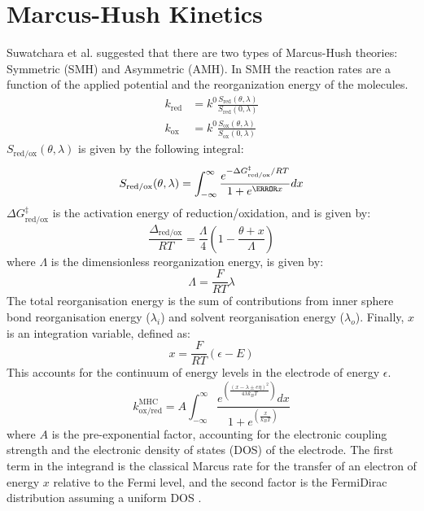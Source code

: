 \documentclass[12pt]{book}
\begin{document}
\section{Marcus-Hush Kinetics}
Suwatchara et al. suggested that there are two types of Marcus-Hush theories: Symmetric (SMH) and Asymmetric (AMH). In SMH the reaction rates are a function of the applied potential and the reorganization energy of the molecules\cite{Suwatchara2012}.
\begin{align}
k_\textrm{red} &= k^0 \frac{S_\textrm{red}(\theta,\lambda)}{S_\textrm{red}(0,\lambda)}\\
k_\textrm{ox} &= k^0 \frac{S_\textrm{ox}(\theta,\lambda)}{S_\textrm{ox}(0,\lambda)}
\end{align}
$S_\textrm{red/ox}(\theta,\lambda)$ is given by the following integral:
\begin{equation}
S_\textrm{red/ox}(\theta,\lambda) = \int_{-\infty}^{\infty} \frac{e^{-\Delta G_\textrm{red/ox}^\ddagger / RT}}{1+ e^{\ps x}}dx
\end{equation}
$\Delta G_\textrm{red/ox}^\ddagger$ is the activation energy of reduction/oxidation, and is given by:
\begin{equation}
\frac{\Delta_\textrm{red/ox}}{RT} = \frac{\Lambda}{4}\left(1 - \frac{\theta + x}{\Lambda}\right)
\end{equation}
where $\Lambda$ is the dimensionless reorganization energy, is given by:
\begin{equation}
\Lambda = \frac{F}{RT}\lambda
\end{equation}
The total reorganisation energy is the sum of contributions from inner sphere bond reorganisation energy ($\lambda_i$) and solvent reorganisation energy ($\lambda_o$). Finally, $x$ is an integration variable, defined as:
\begin{equation}
x = \frac{F}{RT}\left(\epsilon - E\right)
\end{equation}
This accounts for the continuum of energy levels in the electrode of energy $\epsilon$.
\begin{equation}
k_{\textrm{ox/red}}^{\textrm{MHC}}=A\int_{-\infty}^{\infty}\frac{e^{\left(\frac{\left(x-\lambda\pm e\eta\right)^{2}}{4\lambda k_{B}T}\right)}dx}{1+e^{\left(\frac{x}{k_{B}T}\right)}}
\end{equation}
where $A$ is the pre-exponential factor, accounting for the electronic coupling strength and the electronic density of states (DOS) of the electrode. The first term in the integrand is the classical Marcus rate for the transfer of an electron of energy $x$ relative to the Fermi level, and the second factor is the Fermi\textendash Dirac distribution assuming a uniform DOS \cite{Zeng2014}. 
\end{document}
